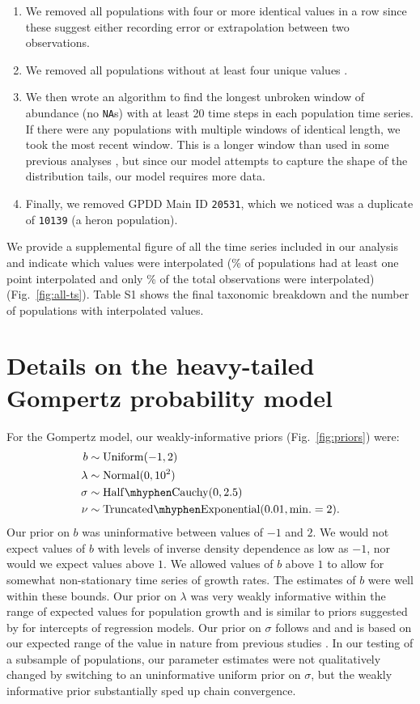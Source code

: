 \begin{enumerate}
\item
  We removed all populations with four or more identical values in a row since these suggest either recording error or extrapolation between two observations.
\item
  We removed all populations without at least four unique values \citep[following][]{brook2006a}.
\item
  We then wrote an algorithm to find the longest unbroken window of abundance (no \texttt{NA}s) with at least 20 time steps in each population time series. If there were any populations with multiple windows of identical length, we took the most recent window. This is a longer window than used in some previous analyses \citep[e.g.][]{brook2006a}, but since our model attempts to capture the shape of the distribution tails, our model requires more data.
\item
  Finally, we removed GPDD Main ID \texttt{20531}, which we noticed was a duplicate of \texttt{10139} (a heron population).
\end{enumerate}
\noindent
We provide a supplemental figure of all the time series included in our analysis and indicate which values were interpolated (\percImputedPops\% of populations had at least one point interpolated and only \percImputedPoints\% of the total observations were interpolated) (Fig.~\ref{fig:all-ts}). Table S1 shows the final taxonomic breakdown and the number of populations with interpolated values.

\section{Details on the heavy-tailed Gompertz probability model}

For the Gompertz model, our weakly-informative priors (Fig.~\ref{fig:priors}) were: 
\begin{align*}
b &\sim \mathrm{Uniform}(-1, 2)\\
\lambda &\sim \mathrm{Normal}(0, 10^2)\\
\sigma &\sim \mathrm{Half\mhyphen Cauchy} (0, 2.5)\\
\nu &\sim \mathrm{Truncated\mhyphen Exponential}(0.01, \mathrm{min.} = 2). \end{align*}
Our prior on $b$ was uninformative between values of $-1$ and $2$. We would not expect values of $b$ with levels of inverse density dependence as low as $-1$, nor would we expect values above $1$. We allowed values of $b$ above $1$ to allow for somewhat non-stationary time series of growth rates. The estimates of $b$ were well within these bounds. Our prior on $\lambda$ was very weakly informative within the range of expected values for population growth and is similar to priors suggested by \citet{gelman2008d} for intercepts of regression models. Our prior on $\sigma$ follows \citet{gelman2006c} and \citet{gelman2008d} and is based on our expected range of the value in nature from previous studies \citep[e.g.][]{connors2014}. In our testing of a subsample of populations, our parameter estimates were not qualitatively changed by switching to an uninformative uniform prior on $\sigma$, but the weakly informative prior substantially sped up chain convergence.

